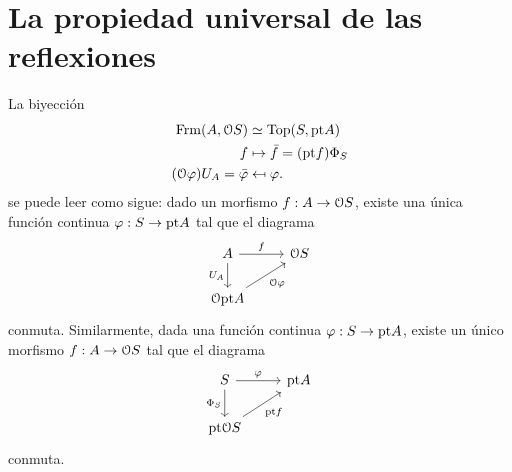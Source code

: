 \section{La propiedad universal de las reflexiones}
La biyección
\begin{align*}
    \Frm(A,\cal OS) &\simeq \Top(S,\pt A) \\
    f &\mapsto \bar f = (\pt f)\Phi_S \\
    (\cal O\phi)U_A = \bar\phi &\mapsfrom \phi.
\end{align*}
se puede leer como sigue:
dado un morfismo $f:A\to\cal OS$, existe una única función continua
$\phi:S\to\pt A$ tal que el diagrama
\[
    \begin{tikzcd}
        A \ar[r,"f"] \ar[d,"U_A"'] & \cal OS \\
        \cal O\pt A \ar[ur,"\cal O\phi"']
    \end{tikzcd}
\]
conmuta.
Similarmente, dada una función continua $\phi:S\to\pt A$, existe
un único morfismo $f:A\to\cal OS$ tal que el diagrama
\[
    \begin{tikzcd}
        S \ar[r,"\phi"] \ar[d,"\Phi_S"'] & \pt A \\
        \pt\cal OS \ar[ur,"\pt f"']
    \end{tikzcd}
\]
conmuta.

